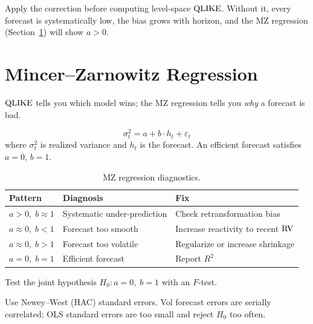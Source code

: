 \begin{keyidea}
Apply the correction before computing level-space $\operatorname{QLIKE}$.
Without it, every forecast is systematically low, the bias grows with horizon, and the MZ regression (Section~\ref{sec:mz}) will show $a > 0$.
\end{keyidea}


\section{Mincer--Zarnowitz Regression}
\label{sec:mz}

$\operatorname{QLIKE}$ tells you which model wins; the MZ regression tells you \emph{why} a forecast is bad.

\begin{equation}
\label{eq:mz}
\sigma^2_t = a + b \cdot h_t + \varepsilon_t
\end{equation}
where $\sigma^2_t$ is realized variance and $h_t$ is the forecast.
An efficient forecast satisfies $a = 0$, $b = 1$.

\begin{table}[htbp]
\centering
\caption{MZ regression diagnostics.}
\label{tab:mz-diagnostics}
\small
\begin{tabular}{@{}llp{5cm}@{}}
\toprule
\textbf{Pattern} & \textbf{Diagnosis} & \textbf{Fix} \\
\midrule
$a > 0,\; b \approx 1$ & Systematic under-prediction    & Check retransformation bias \\
$a \approx 0,\; b < 1$ & Forecast too smooth            & Increase reactivity to recent $\operatorname{RV}$ \\
$a \approx 0,\; b > 1$ & Forecast too volatile           & Regularize or increase shrinkage \\
$a = 0,\; b = 1$       & Efficient forecast             & Report $R^2$ \\
\bottomrule
\end{tabular}
\end{table}

Test the joint hypothesis $H_0\colon a = 0,\; b = 1$ with an $F$-test.

\begin{warning}
Use Newey--West (HAC) standard errors.
Vol forecast errors are serially correlated; OLS standard errors are too small and reject $H_0$ too often.
\end{warning}


